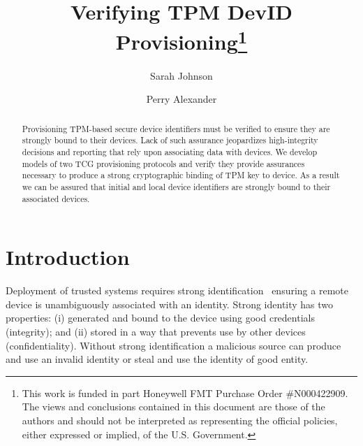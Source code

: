 \documentclass[runningheads]{llncs}
\begin{document}
%
\title{Verifying TPM DevID Provisioning\thanks{This work is funded in part
    Honeywell FMT Purchase Order
    \#N000422909. The views and conclusions contained in this document
    are those of the authors and should not be interpreted as
    representing the official policies, either expressed or implied,
    of the U.S. Government.}}
%
%
\author{Sarah Johnson \and
Perry Alexander}
%
%
%
\maketitle              %
%
\begin{abstract}
  Provisioning TPM-based secure device identifiers must be verified
  to ensure they are strongly bound to their devices.
  Lack of such assurance jeopardizes high-integrity decisions and
  reporting that rely upon associating data with devices.  We develop
  models of two TCG provisioning protocols and verify they provide
  assurances necessary to produce a strong cryptographic binding
  of TPM key to device.  As a result we can be assured that initial
  and local device identifiers are strongly bound to their associated
  devices.

\end{abstract}
%
%
%
\section{Introduction}

Deployment of trusted systems requires strong
identification~\citep{Martin:08:The-ten-page-in} ensuring a remote
device is unambiguously associated with an identity. Strong identity
has two properties: (i) generated and bound to the device using good
credentials (integrity); and (ii) stored in a way that prevents use by
other devices (confidentiality).  Without strong identification a
malicious source can produce and use an invalid identity or steal and
use the identity of good entity.
\end{document}
